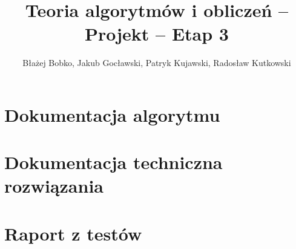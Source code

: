 \documentclass{../llncs_template_final/llncs}
\begin{document}
\title{Teoria algorytmów i obliczeń -- Projekt -- Etap 3}
\author{Błażej Bobko, Jakub Gocławski, Patryk Kujawski, Radosław Kutkowski}
\maketitle 

\section{Dokumentacja algorytmu}

\section{Dokumentacja techniczna rozwiązania}

\section{Raport z testów}
\end{document}
